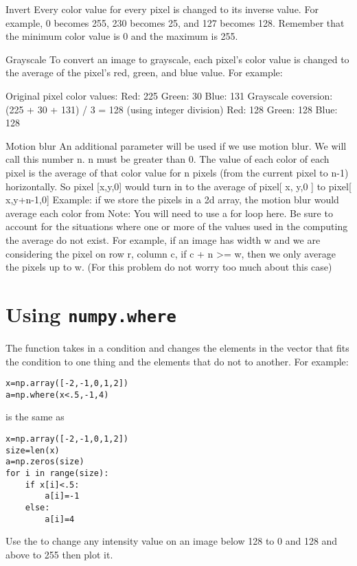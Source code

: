 Invert
Every color value for every pixel is changed to its inverse value. For example, 0 
becomes 255, 230 becomes 25, and 127 becomes 128. Remember that the minimum 
color value is 0 and the maximum is 255.

Grayscale
To convert an image to grayscale, each pixel’s color value is changed to the average of 
the pixel’s red, green, and blue value. For example:

Original pixel color values:
Red: 225 Green: 30 Blue: 131
Grayscale coversion: (225 + 30 + 131) / 3 = 128 (using integer division)
Red: 128 Green: 128 Blue: 128

Motion blur
An additional parameter will be used if we use motion blur. We will call this number n. n must be greater than 0.
The value of each color of each pixel is the average of that color value for n pixels (from 
the current pixel to n-1) horizontally. So pixel [x,y,0] would turn in to the average of
pixel[ x, y,0 ] to pixel[ x,y+n-1,0] 
Example: if we store the pixels in a 2d array, the motion blur would average each color 
from Note: You will need to use a for loop here.
Be sure to account for the situations where one or more of the values used in the 
computing the average do not exist. For example, if an image has width w and we are 
considering the pixel on row r, column c, if c + n >= w, then we only average the pixels 
up to w. (For this problem do not worry too much about this case)

\section*{Using \texttt{numpy.where}}
The  function takes in a condition and changes the elements in the 
vector that fits the condition to one thing and the elements that do not to another. 
For example:
\begin{lstlisting}
x=np.array([-2,-1,0,1,2])
a=np.where(x<.5,-1,4)
\end{lstlisting}
is the same as
\begin{lstlisting}
x=np.array([-2,-1,0,1,2])
size=len(x)
a=np.zeros(size)
for i in range(size):
    if x[i]<.5:
        a[i]=-1
    else:
        a[i]=4
\end{lstlisting}

\begin{problem}
Use the  to change any intensity value on an image below 128 to 0 and 128 and above to 255 then plot it.
\end{problem}

